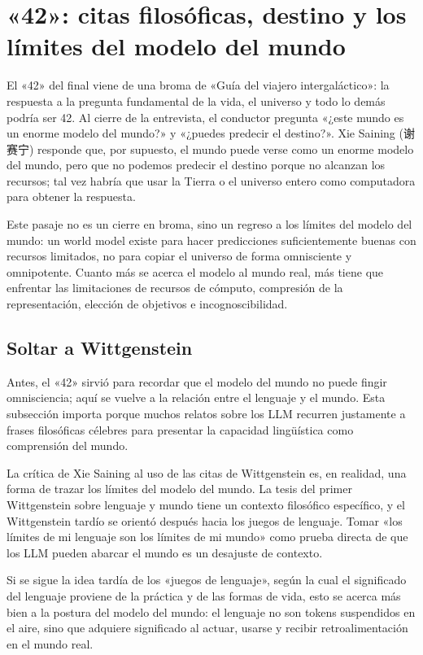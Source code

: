 \section{«42»: citas filosóficas, destino y los límites del modelo del mundo}

El «42» del final viene de una broma de «Guía del viajero intergaláctico»: la respuesta a la pregunta fundamental de la vida, el universo y todo lo demás podría ser 42. Al cierre de la entrevista, el conductor pregunta «¿este mundo es un enorme modelo del mundo?» y «¿puedes predecir el destino?». Xie Saining (谢赛宁) responde que, por supuesto, el mundo puede verse como un enorme modelo del mundo, pero que no podemos predecir el destino porque no alcanzan los recursos; tal vez habría que usar la Tierra o el universo entero como computadora para obtener la respuesta.

Este pasaje no es un cierre en broma, sino un regreso a los límites del modelo del mundo: un world model existe para hacer predicciones suficientemente buenas con recursos limitados, no para copiar el universo de forma omnisciente y omnipotente. Cuanto más se acerca el modelo al mundo real, más tiene que enfrentar las limitaciones de recursos de cómputo, compresión de la representación, elección de objetivos e incognoscibilidad.

\subsection{Soltar a Wittgenstein}

Antes, el «42» sirvió para recordar que el modelo del mundo no puede fingir omnisciencia; aquí se vuelve a la relación entre el lenguaje y el mundo. Esta subsección importa porque muchos relatos sobre los LLM recurren justamente a frases filosóficas célebres para presentar la capacidad lingüística como comprensión del mundo.

La crítica de Xie Saining al uso de las citas de Wittgenstein es, en realidad, una forma de trazar los límites del modelo del mundo. La tesis del primer Wittgenstein sobre lenguaje y mundo tiene un contexto filosófico específico, y el Wittgenstein tardío se orientó después hacia los juegos de lenguaje. Tomar «los límites de mi lenguaje son los límites de mi mundo» como prueba directa de que los LLM pueden abarcar el mundo es un desajuste de contexto.

Si se sigue la idea tardía de los «juegos de lenguaje», según la cual el significado del lenguaje proviene de la práctica y de las formas de vida, esto se acerca más bien a la postura del modelo del mundo: el lenguaje no son tokens suspendidos en el aire, sino que adquiere significado al actuar, usarse y recibir retroalimentación en el mundo real.


